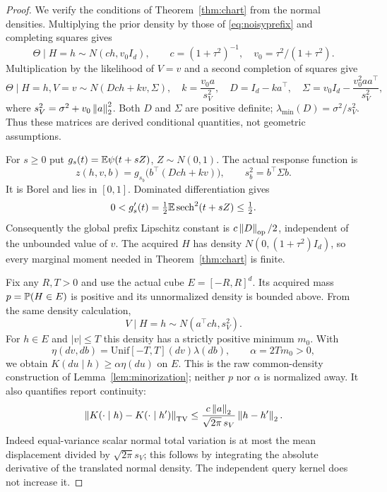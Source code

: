 \begin{proof}
We verify the conditions of Theorem~\ref{thm:chart} from the normal densities. Multiplying the prior density by those of \eqref{eq:noisyprefix} and completing squares gives
\[
 \Theta\mid H=h\sim N(ch,v_0I_d),\qquad
 c=(1+\tau^2)^{-1},\quad v_0=\tau^2/(1+\tau^2).
\]
Multiplication by the likelihood of $V=v$ and a second completion of squares give
\begin{equation}\label{eq:posteriornoisy}
 \Theta\mid H=h,V=v\sim N(Dch+kv,\Sigma),
 \quad k=\frac{v_0a}{s_V^2},\quad D=I_d-ka^\top,
 \quad \Sigma=v_0I_d-\frac{v_0^2aa^\top}{s_V^2},
\end{equation}
where $s_V^2=\sigma^2+v_0\left\lVert a\right\rVert_2^2$. Both $D$ and $\Sigma$ are positive definite; $\lambda_{\min}(D)=\sigma^2/s_V^2$. Thus these matrices are derived conditional quantities, not geometric assumptions.

For $s\ge0$ put $g_s(t)=\mathbb E\psi(t+sZ)$, $Z\sim N(0,1)$. The actual response function is
\begin{equation}\label{eq:regresponse}
 z(h,v,b)=g_{s_b}\bigl(b^\top(Dch+kv)\bigr),\qquad
 s_b^2=b^\top\Sigma b.
\end{equation}
It is Borel and lies in $[0,1]$. Dominated differentiation gives
\begin{equation}\label{eq:smoothlower}
 0<g_s'(t)=\tfrac12\mathbb E\operatorname{sech}^2(t+sZ)\le\tfrac12.
\end{equation}
Consequently the global prefix Lipschitz constant is $c\left\lVert D\right\rVert_{\mathrm{op}}/2$, independent of the unbounded value of $v$. The acquired $H$ has density $N(0,(1+\tau^2)I_d)$, so every marginal moment needed in Theorem~\ref{thm:chart} is finite.

Fix any $R,T>0$ and use the actual cube $E=[-R,R]^d$. Its acquired mass $p=\mathbb P(H\in E)$ is positive and its unnormalized density is bounded above. From the same density calculation,
\[
 V\mid H=h\sim N(a^\top ch,s_V^2).
\]
For $h\in E$ and $|v|\le T$ this density has a strictly positive minimum $m_0$. With
\[
 \eta(dv,db)=\mathrm{Unif}[-T,T](dv)\lambda(db),\qquad
 \alpha=2Tm_0>0,
\]
we obtain $K(du\mid h)\ge\alpha\eta(du)$ on $E$. This is the raw common-density construction of Lemma~\ref{lem:minorization}; neither $p$ nor $\alpha$ is normalized away. It also quantifies report continuity:
\begin{equation}\label{eq:noisytv}
 \left\lVert K(\cdot\mid h)-K(\cdot\mid h')\right\rVert_{\operatorname{TV}}
 \le \frac{c\left\lVert a\right\rVert_2}{\sqrt{2\pi}\,s_V}\left\lVert h-h'\right\rVert_2.
\end{equation}
Indeed equal-variance scalar normal total variation is at most the mean displacement divided by $\sqrt{2\pi}s_V$; this follows by integrating the absolute derivative of the translated normal density. The independent query kernel does not increase it.


\end{proof}
